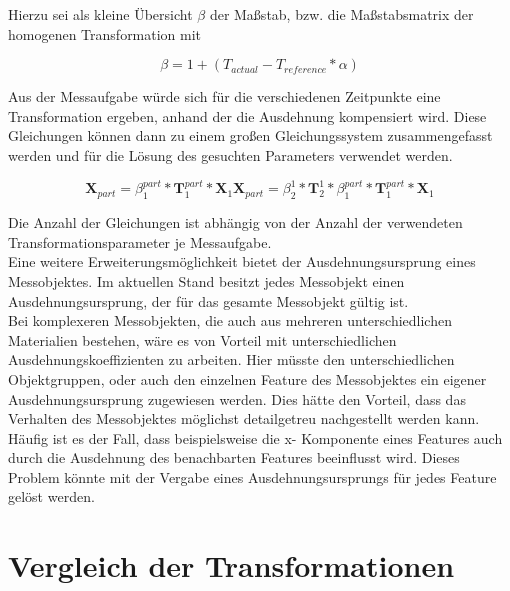 Hierzu sei als kleine Übersicht $\beta$ der Maßstab, bzw. die Maßstabsmatrix der homogenen Transformation mit

\begin{equation}
\beta = 1 + (T_{actual} - T_{reference} * \alpha)
\end{equation} 

Aus der Messaufgabe würde sich für die verschiedenen Zeitpunkte eine Transformation ergeben, anhand der die Ausdehnung kompensiert wird.
Diese Gleichungen können dann zu einem großen Gleichungssystem zusammengefasst werden und für die Lösung des gesuchten Parameters verwendet werden.

\begin{equation}
\textbf{X}_{part} = \beta_{1}^{part} * \textbf{T}_{1}^{part} * \textbf{X}_{1}
\textbf{X}_{part} = \beta_{2}^{1} * \textbf{T}_{2}^{1} * \beta_{1}^{part} * \textbf{T}_{1}^{part} * \textbf{X}_{1}
\end{equation}

Die Anzahl der Gleichungen ist abhängig von der Anzahl der verwendeten Transformationsparameter je Messaufgabe.\\

Eine weitere Erweiterungsmöglichkeit bietet der Ausdehnungsursprung eines Messobjektes. Im aktuellen Stand besitzt jedes Messobjekt einen Ausdehnungsursprung, der für das gesamte Messobjekt gültig ist.\\
Bei komplexeren Messobjekten, die auch aus mehreren unterschiedlichen Materialien bestehen, wäre es von Vorteil mit unterschiedlichen Ausdehnungskoeffizienten zu arbeiten. Hier müsste den unterschiedlichen Objektgruppen, oder auch den einzelnen Feature des Messobjektes ein eigener Ausdehnungsursprung zugewiesen werden. Dies hätte den Vorteil, dass das Verhalten des Messobjektes möglichst detailgetreu nachgestellt werden kann. Häufig ist es der Fall, dass beispielsweise die x- Komponente eines Features auch durch die Ausdehnung des benachbarten Features beeinflusst wird. Dieses Problem könnte mit der Vergabe eines Ausdehnungsursprungs für jedes Feature gelöst werden.

\nocite{Keferstein2008}
\nocite{Dillinger2007}
\nocite{Graf1969}
\nocite{Zhu2008}




\appendix
\chapter{Vergleich der Transformationen}\label{chap:vergleichtrafo}

